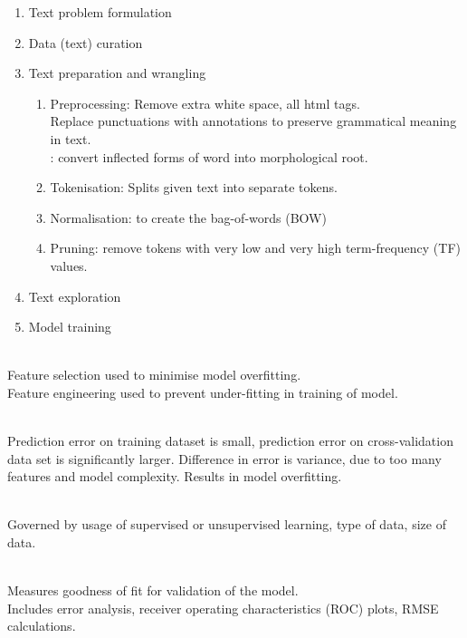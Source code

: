 \begin{method} 
\begin{enumerate}[label=\roman*.]
\setlength{\itemsep}{0pt}
\item Text problem formulation
\item Data (text) curation
\item Text preparation and wrangling
\begin{enumerate}[label=\arabic*.]
\setlength{\itemsep}{0pt}
\item Preprocessing: Remove extra white space, all html tags.\\
Replace punctuations with annotations to preserve grammatical meaning in text.\\
: convert inflected forms of word into morphological root.
\item Tokenisation: Splits given text into separate tokens.
\item Normalisation: to create the bag-of-words (BOW)
\item Pruning: remove tokens with very low and very high term-frequency (TF) values.
\end{enumerate}
\item Text exploration
\item Model training
\end{enumerate}
\end{method}

\begin{method} \\
Feature selection used to minimise model overfitting.\\
Feature engineering used to prevent under-fitting in training of model.
\end{method}

\begin{definition} \\
Prediction error on training dataset is small, prediction error on cross-validation data set is significantly larger. Difference in error is variance, due to too many features and model complexity. Results in model overfitting.
\end{definition}

\begin{method} \\
Governed by usage of supervised or unsupervised learning, type of data, size of data.
\end{method}

\begin{method} \\
Measures goodness of fit for validation of the model.\\
Includes error analysis, receiver operating characteristics (ROC) plots, RMSE calculations.
\end{method}
